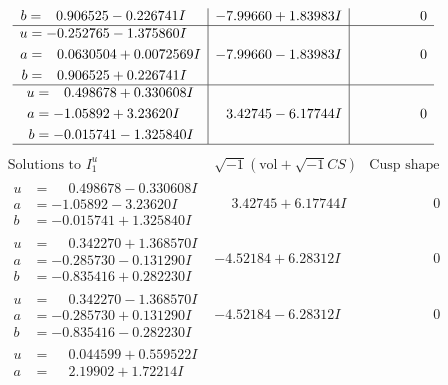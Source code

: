 \documentclass[1p]{elsarticle_modified}
\theoremstyle{definition}
\newcommand{\I}{\sqrt{-1}}
\begin{document}
$$\begin{array}{c|c|c}
\begin{aligned}
b &= \phantom{-}0.906525 - 0.226741 I\end{aligned}
 & -7.99660 + 1.83983 I & \phantom{-0.000000 } 0 \\ \hline\begin{aligned}
u &= -0.252765 - 1.375860 I \\
a &= \phantom{-}0.0630504 + 0.0072569 I \\
b &= \phantom{-}0.906525 + 0.226741 I\end{aligned}
 & -7.99660 - 1.83983 I & \phantom{-0.000000 } 0 \\ \hline\begin{aligned}
u &= \phantom{-}0.498678 + 0.330608 I \\
a &= -1.05892 + 3.23620 I \\
b &= -0.015741 - 1.325840 I\end{aligned}
 & \phantom{-}3.42745 - 6.17744 I & \phantom{-0.000000 } 0\\
 \hline 
 \end{array}$$\newpage$$\begin{array}{c|c|c}  
\text{Solutions to }I^u_{1}& \I (\text{vol} + \sqrt{-1}CS) & \text{Cusp shape}\\
 \hline 
\begin{aligned}
u &= \phantom{-}0.498678 - 0.330608 I \\
a &= -1.05892 - 3.23620 I \\
b &= -0.015741 + 1.325840 I\end{aligned}
 & \phantom{-}3.42745 + 6.17744 I & \phantom{-0.000000 } 0 \\ \hline\begin{aligned}
u &= \phantom{-}0.342270 + 1.368570 I \\
a &= -0.285730 - 0.131290 I \\
b &= -0.835416 + 0.282230 I\end{aligned}
 & -4.52184 + 6.28312 I & \phantom{-0.000000 } 0 \\ \hline\begin{aligned}
u &= \phantom{-}0.342270 - 1.368570 I \\
a &= -0.285730 + 0.131290 I \\
b &= -0.835416 - 0.282230 I\end{aligned}
 & -4.52184 - 6.28312 I & \phantom{-0.000000 } 0 \\ \hline\begin{aligned}
u &= \phantom{-}0.044599 + 0.559522 I \\
a &= \phantom{-}2.19902 + 1.72214 I \\

\end{aligned}
\end{array}$$
\end{document}
